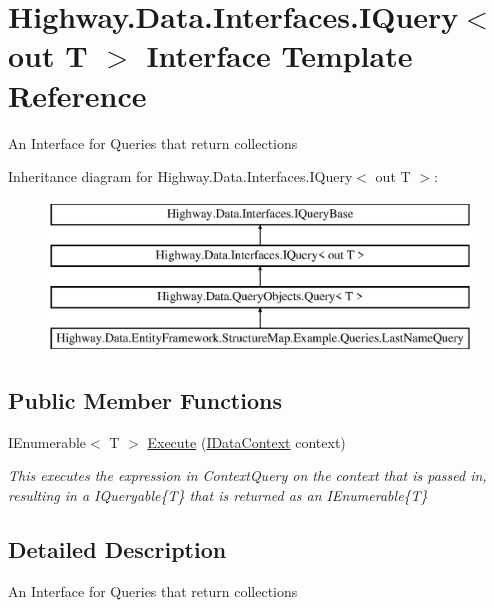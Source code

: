 \hypertarget{interface_highway_1_1_data_1_1_interfaces_1_1_i_query-g}{\section{Highway.\-Data.\-Interfaces.\-I\-Query$<$ out T $>$ Interface Template Reference}
\label{interface_highway_1_1_data_1_1_interfaces_1_1_i_query-g}
}


An Interface for Queries that return collections  


Inheritance diagram for Highway.\-Data.\-Interfaces.\-I\-Query$<$ out T $>$\-:\begin{figure}[H]
\begin{center}
\leavevmode
\includegraphics[height=4.000000cm]{interface_highway_1_1_data_1_1_interfaces_1_1_i_query-g}
\end{center}
\end{figure}
\subsection*{Public Member Functions}
\begin{DoxyCompactItemize}
\item 
I\-Enumerable$<$ T $>$ \hyperlink{interface_highway_1_1_data_1_1_interfaces_1_1_i_query-g_af0d1ad34be86383555892f3dfeb4b2dc}{Execute} (\hyperlink{interface_highway_1_1_data_1_1_interfaces_1_1_i_data_context}{I\-Data\-Context} context)
\begin{DoxyCompactList}\small\item\em This executes the expression in Context\-Query on the context that is passed in, resulting in a I\-Queryable\{\-T\} that is returned as an I\-Enumerable\{\-T\} \end{DoxyCompactList}\end{DoxyCompactItemize}


\subsection{Detailed Description}
An Interface for Queries that return collections 


